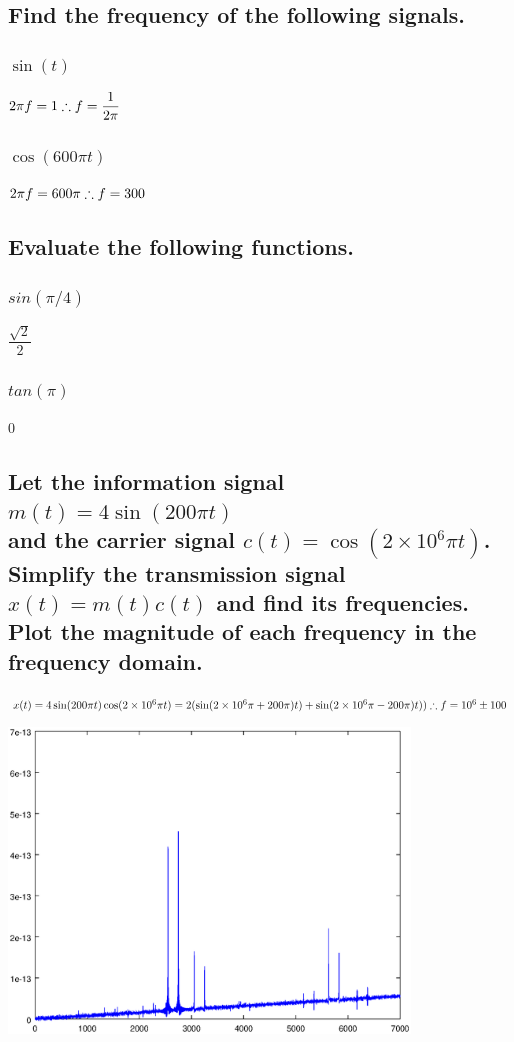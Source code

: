 \documentclass[12pt,a4paper]{article}
\begin{document}
\subsection{Find the frequency of the following signals.} 
\subsubsection{$\sin(t)$}
$2\pi f = 1\\ 
\therefore f = \dfrac{1}{2\pi}$
\subsubsection{$\cos(600\pi t)$}
$2\pi f = 600\pi\\
\therefore f =  300$

\subsection{Evaluate the following functions.} 
\subsubsection{$sin(\pi /4)$}
$\dfrac{\sqrt{2}}{2} $
\subsubsection{$tan(\pi )$} 
0
\subsection{Let the information signal $m(t)=4\sin (200\pi t)$ \\
	and the carrier signal $c(t)=\cos(2\times 10^6\pi t)$.\\
Simplify the transmission signal $x(t)=m(t)c(t)$ and	find its frequencies. \\
 Plot the magnitude of each frequency in the	frequency domain.} 
$x(t) = 4\sin(200\pi t)\cos(2\times 10^6\pi t)=2(\sin(2\times 10^6\pi + 200\pi )t)+\sin(2\times 10^6\pi - 200\pi) t))\\
\therefore f = 10^6 \pm 100$

\includegraphics[width=0.8\textwidth]{h.eps}
\end{document}
